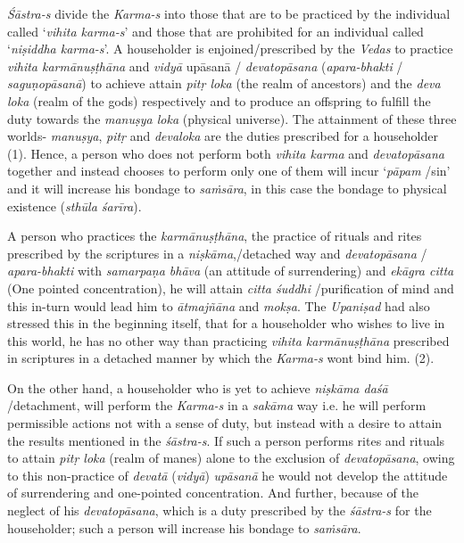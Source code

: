 \emph{Śāstra-s} divide the \emph{Karma-s} into those that are to be practiced by the individual called `\emph{vihita karma-s}' and those that are prohibited for an individual called `\emph{niṣiddha karma-s}'. A householder is enjoined/prescribed by the \emph{Vedas} to practice \emph{vihita karmānuṣṭhāna} and \emph{vidyā} upāsanā / \emph{devatopāsana} (\emph{apara-bhakti} / \emph{saguṇopāsanā}) to achieve attain \emph{pitṛ loka} (the realm of ancestors) and the \emph{deva loka} (realm of the gods) respectively and to produce an offspring to fulfill the duty towards the \emph{manuṣya loka} (physical universe). The attainment of these three worlds- \emph{manuṣya}, \emph{pitṛ} and \emph{devaloka} are the duties prescribed for a householder (1). Hence, a person who does not perform both \emph{vihita karma} and \emph{devatopāsana} together and instead chooses to perform only one of them will incur `\emph{pāpam} /sin' and it will increase his bondage to \emph{saṁsāra}, in this case the bondage to physical existence (\emph{sthūla śarīra}).

A person who practices the \emph{karmānuṣṭhāna}, the practice of rituals and rites prescribed by the scriptures in a \emph{niṣkāma},/detached way and \emph{devatopāsana} / \emph{apara-bhakti} with \emph{samarpaṇa bhāva} (an attitude of surrendering) and \emph{ekāgra citta} (One pointed concentration), he will attain \emph{citta śuddhi} /purification of mind and this in-turn would lead him to \emph{ātmajñāna} and \emph{mokṣa}. The \emph{Upaniṣad} had also stressed this in the beginning itself, that for a householder who wishes to live in this world, he has no other way than practicing \emph{vihita karmānuṣṭhāna} prescribed in scriptures in a detached manner by which the \emph{Karma-s} wont bind him. (2).

On the other hand, a householder who is yet to achieve \emph{niṣkāma daśā} /detachment, will perform the \emph{Karma-s} in a \emph{sakāma} way i.e. he will perform permissible actions not with a sense of duty, but instead with a desire to attain the results mentioned in the \emph{śāstra-s}. If such a person performs rites and rituals to attain \emph{pitṛ loka} (realm of manes) alone to the exclusion of \emph{devatopāsana}, owing to this non-practice of \emph{devatā} (\emph{vidyā}) \emph{upāsanā} he would not develop the attitude of surrendering and one-pointed concentration. And further, because of the neglect of his \emph{devatopāsana}, which is a duty prescribed by the \emph{śāstra-s} for the householder; such a person will increase his bondage to \emph{saṁsāra}.

